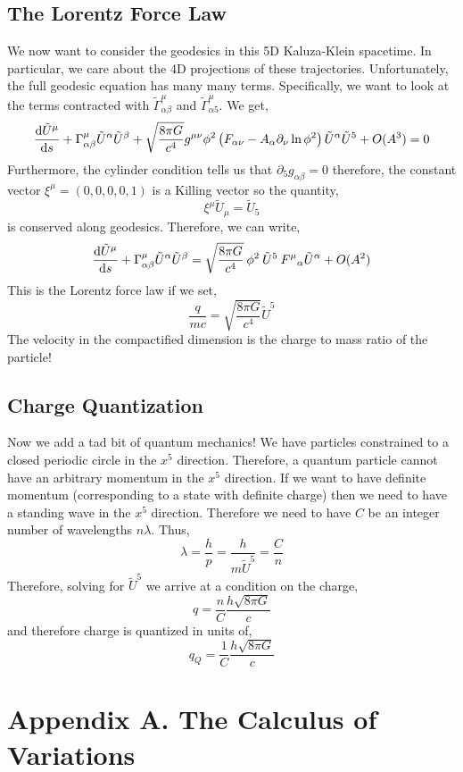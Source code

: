 \documentclass[11pt, a4paper]{article}
\begin{document}
\subsection{The Lorentz Force Law}

We now want to consider the geodesics in this 5D Kaluza-Klein spacetime. In particular, we care about the 4D projections of these trajectories. Unfortunately, the full geodesic equation has many many terms. Specifically, we want to look at the terms contracted with $\tilde{\Gamma}^{\mu}_{\alpha \beta}$ and $\tilde{\Gamma}^{\mu}_{\alpha 5}$. We get,
\[ \frac{\mathrm{d}\tilde{U}^\mu}{\mathrm{d}s} + \Gamma^\mu_{\alpha \beta} \tilde{U}^\alpha \tilde{U}^\beta + \sqrt{\frac{8 \pi G}{c^4}} g^{\mu \nu} \phi^2 \left( F_{\alpha \nu} - A_{\alpha} \partial_{\nu} \ln{\phi^2} \right) \tilde{U}^\alpha \tilde{U}^5 + O(A^3) = 0 \]
Furthermore, the cylinder condition tells us that $\partial_5 g_{\alpha \beta} = 0$ therefore, the constant vector $\xi^\mu = (0, 0, 0, 0, 1)$ is a Killing vector so the quantity,
\[ \xi^\mu \tilde{U}_\mu = \tilde{U}_5 \]
is conserved along geodesics. Therefore, we can write,
\[ \frac{\mathrm{d}\tilde{U}^\mu}{\mathrm{d}s} + \Gamma^\mu_{\alpha \beta} \tilde{U}^\alpha \tilde{U}^\beta = \sqrt{\frac{8 \pi G}{c^4}} \: \phi^2 \: \tilde{U}^5 \: {F^\mu}_{\alpha} \tilde{U}^\alpha + O(A^2) \]
This is the Lorentz force law if we set,
\[ \frac{q}{mc} = \sqrt{\frac{8 \pi G}{c^4}} \tilde{U}^5\]
The velocity in the compactified dimension is the charge to mass ratio of the particle!

\subsection{Charge Quantization}

Now we add a tad bit of quantum mechanics! We have particles constrained to a closed periodic circle in the $x^5$ direction. Therefore, a quantum particle cannot have an arbitrary momentum in the $x^5$ direction. If we want to have definite momentum (corresponding to a state with definite charge) then we need to have a standing wave in the $x^5$ direction. Therefore we need to have $C$ be an integer number of wavelengths $n \lambda$. Thus,
\[ \lambda = \frac{h}{p} = \frac{h}{m \tilde{U}^5} = \frac{C}{n} \]  
Therefore, solving for $\tilde{U}^5$ we arrive at a condition on the charge,
\[ q = \frac{n}{C} \frac{h \sqrt{8 \pi G}}{c}  \]
and therefore charge is quantized in units of,
\[ q_Q = \frac{1}{C} \frac{h \sqrt{8 \pi G}}{c} \]

\section{Appendix A. The Calculus of Variations}
\end{document}
